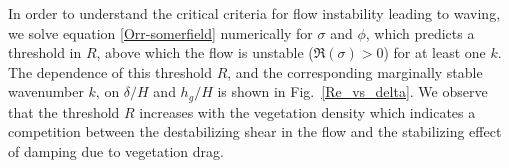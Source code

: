 \documentclass[12pt]{report}   %
\newcommand{\hg}{h_g}
\newcommand{\Rey}{{R}}
\begin{document}
In order to understand the critical criteria for flow instability leading to waving, we solve equation \eqref{Orr-somerfield} numerically for $\sigma$ and $\phi$, which predicts a threshold in $\Rey$, above which the flow is unstable ($\Re(\sigma)>0$) for at least one $k$. 
The dependence of this threshold $\Rey$, and the corresponding marginally stable wavenumber $k$, on $\delta/H$ and $\hg/H$ is shown in Fig.~\ref{Re_vs_delta}. We observe that the threshold $\Rey$ increases with the vegetation density which indicates a competition between the destabilizing shear in the flow and the stabilizing effect of damping due to vegetation drag.
\end{document}
